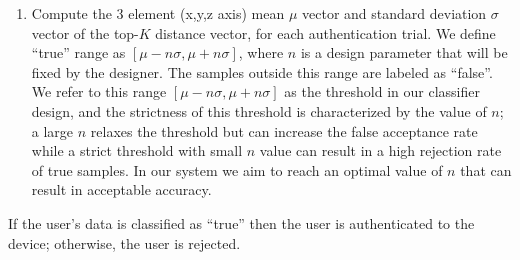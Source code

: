 \begin{enumerate}
\item Compute the 3 element (x,y,z axis) mean $\mu$ vector and standard
deviation $\sigma$ vector of the top-$K$ distance vector, for each 
authentication trial.
We define ``true'' range as $[\mu-n\sigma, \mu+n\sigma]$, where $n$ is a design
parameter that will be fixed by the designer. The samples outside this
range are labeled as ``false''.
We refer to this range $[\mu-n\sigma, \mu+n\sigma]$ as the threshold in our
classifier design, and the strictness of this threshold is characterized by 
the value of $n$; a large $n$ relaxes the threshold but can increase the false 
acceptance rate while a strict threshold with small $n$ value can result in a 
high rejection rate of true samples. In our system we aim to reach an optimal 
value of $n$ that can result in acceptable accuracy. 
\end{enumerate}
If the user's data is classified as ``true'' then the user is authenticated to the device; otherwise, the user is rejected. 

